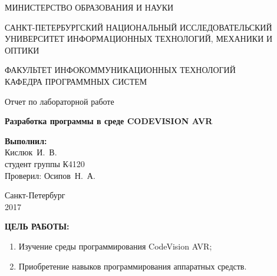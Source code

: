 \documentclass[14pt,a4paper]{extreport}
\newcommand{\header}[1]{%
{
\clearpage%
\fontsize{16pt}{14pt}\selectfont
\begin{center}
\textbf{\MakeUppercase{#1}:}
\end{center}
}
}
\newcommand{\labyear}{2017}
\newcommand{\labtitle}{Разработка программы в среде CODEVISION AVR}
\newcommand{\prepod}{Осипов~Н.~А.}
\newcommand{\student}{Кислюк~И.~В.}
\begin{document}
	\begin{titlepage}
	\begin{center}	
		\fontsize{14pt}{14pt}\selectfont
		МИНИСТЕРСТВО ОБРАЗОВАНИЯ И НАУКИ\\

		\vspace*{0.6\baselineskip}

		\MakeUppercase{Санкт-Петербургский Национальный Исследовательский Университет Информационных технологий, механики и оптики}		
		
		\vspace*{0.6\baselineskip}
		\MakeUppercase{Факультет Инфокоммуникационных технологий}\\
		\MakeUppercase{Кафедра программных систем}
	
		\vspace*{7\baselineskip}
		\fontsize{19pt}{18pt}\selectfont
		Отчет по лабораторной работе
		
		\fontsize{20pt}{18pt}\selectfont
		\textbf{\labtitle}\\
		\vspace*{1.15\baselineskip}
		\end{center}
	
	\vspace*{2\baselineskip}
	\begin{flushright}
	\fontsize{14pt}{14pt}\selectfont
	\textbf{Выполнил:}\\
	\student\\
	студент группы К4120\\
	Проверил: \prepod\\
	\end{flushright}
	
	\vspace{\fill}
	\begin{center}
	Санкт-Петербург\\
	\vspace{-1ex}
	\labyear
	\end{center}
	
\end{titlepage}

\fontsize{14pt}{14pt}\selectfont

\header{Цель работы}


\begin{enumerate}

\item Изучение среды программирования CodeVision AVR;
\item Приобретение навыков программирования аппаратных средств.

\end{enumerate}
\end{document}
